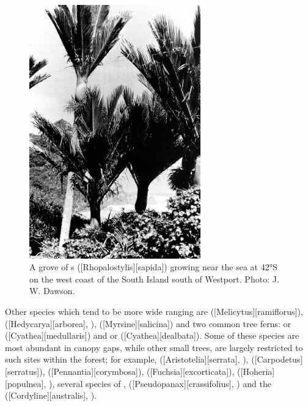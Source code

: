 \begin{figure}
	\includegraphics[width=0.66\textwidth]{graphics/figure60nikau.jpg}
	\centering
	\caption[A grove of nikau palms]{A grove of s ([Rhopalostylis][sapida]) growing near the sea at \ang{42}S on the west coast of the South Island south of Westport. Photo:  J. W. Dawson.}%
	\label{fig:60nikau}
\end{figure}

Other species which tend to be more wide ranging are  ([Melicytus][ramiflorus]),  ([Hedycarya][arborea], ),  ([Myrsine][salicina]) and two common tree ferns:  or  ([Cyathea][medullaris]) and  or  ([Cyathea][dealbata]).
Some of these species are most abundant in canopy gaps, while other small trees, are largely restricted to such sites within the forest; for example,  ([Aristotelia][serrata], ),  ([Carpodetus][serratus]),  ([Pennantia][corymbosa]),  ([Fuchsia][excorticata]),  ([Hoheria][populnea], ), several species of ,  ([Pseudopanax][crassifolius], ) and the  ([Cordyline][australis], ).

